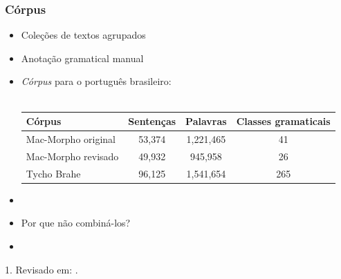 \documentclass[10pt]{beamer}
\begin{document}
\begin{frame}[fragile]
  \frametitle{Córpus}

  \begin{itemize}
    \item[-] Coleções de textos agrupados
    \item[-] Anotação gramatical manual
    \item[-] \textit{Córpus} para o português brasileiro:\\ \

    \begin{table}[!htb]
    \footnotesize
    \centering
    \begin{tabular}{lccc}
      \toprule
      \textbf{Córpus} & \textbf{Sentenças}  & \textbf{Palavras}  & \textbf{Classes gramaticais}  \\
      \midrule
      Mac-Morpho original & 53,374 & 1,221,465 & 41  \\
      Mac-Morpho revisado\footnotemark & 49,932 & 945,958   & 26  \\
      Tycho Brahe         & 96,125 & 1,541,654 & 265 \\
      \bottomrule
    \end{tabular}
    \end{table}

  \item[\ ] \ 
  \item[-] Por que não combiná-los?
  \item[\ ] \ 
  \end{itemize}


{\scriptsize 1. Revisado em: \cite{fonseca2015evaluating}.}

\end{frame}
\end{document}
